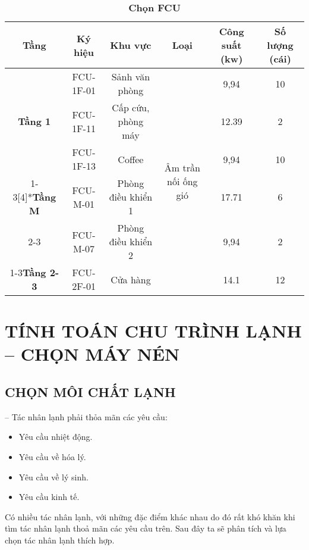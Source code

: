 \begin{table}[H]
\newpage
\begin{table}[H]
	\centering
	\caption{\textbf{Chọn FCU}}
	\begin{tabular}{|c|c|c|c|c|c|}
		\hline
		\textbf{Tầng} & \textbf{Ký hiệu} & \textbf{Khu vực} & \textbf{Loại} & \multicolumn{1}{p{6em}|}{\textbf{Công suất \newline{}(kw)}} & \multicolumn{1}{p{5.4em}|}{\textbf{Số lượng \newline{}(cái)}} \bigstrut\\
		\hline
		\multirow{3}[6]{*}{\textbf{Tầng 1}} & FCU-1F-01 & Sảnh văn phòng & \multicolumn{1}{c|}{\multirow{6}[12]{*}{Âm trần \newline{}nối ống gió}} & 9,94  & 10 \bigstrut\\
		\cline{2-3}\cline{5-6}      & FCU-1F-11 & Cấp cứu, phòng máy &       & 12.39 & 2 \bigstrut\\
		\cline{2-3}\cline{5-6}      & FCU-1F-13 & Coffee &       & 9,94  & 10 \bigstrut\\
		\cline{1-3}\cline{5-6}\multirow{2}[4]{*}{\textbf{Tầng M}} & FCU-M-01 & Phòng điều khiển 1 &       & 17.71 & 6 \bigstrut\\
		\cline{2-3}\cline{5-6}      & FCU-M-07 & Phòng điều khiển 2 &       & 9,94  & 2 \bigstrut\\
		\cline{1-3}\cline{5-6}\textbf{Tầng 2-3} & FCU-2F-01 & Cửa hàng &       & 14.1  & 12 \bigstrut\\
		\hline
	\end{tabular}%
\end{table}
	

\section{TÍNH TOÁN CHU TRÌNH LẠNH – CHỌN MÁY NÉN}
\subsection{CHỌN MÔI CHẤT LẠNH}
-- Tác nhân lạnh phải thỏa mãn các yêu cầu:
\begin{itemize}
	\item Yêu cầu nhiệt động.
	\item Yêu cầu về hóa lý.
	\item Yêu cầu về lý sinh.
	\item Yêu cầu kinh tế.
\end{itemize}

Có nhiều tác nhân lạnh, với những đặc điểm khác nhau do đó rất khó khăn khi tìm tác nhân lạnh thoả mãn các yêu cầu trên. Sau đây ta sẽ phân tích và lựa chọn tác nhân lạnh thích hợp.


\end{table}
